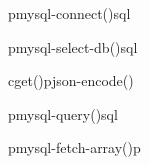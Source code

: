\begin {sequencediagram}





\begin{call}[1]{p}{mysql-connect()}{sql}{}
 \end{call}
 \begin{call}[1]{p}{mysql-select-db()}{sql}{}
 \end{call}
 	\begin{call}{c}{get()}{p}{json-encode()}
 		\begin{call}{p}{mysql-query()}{sql}{}
        \end{call}
        \begin{call}[2]{p}{mysql-fetch-array()}{p}{}
        \end{call}
 	
	\end{call}


\end {sequencediagram}
